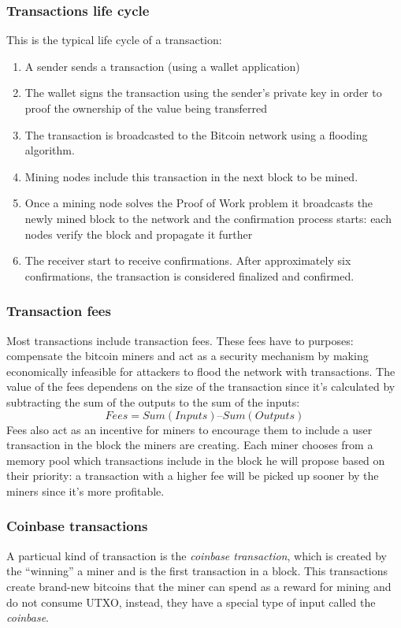 \subsubsection{Transactions life cycle}
This is the typical life cycle of a transaction:
\begin{enumerate}
  \item A sender sends a transaction (using a wallet application)
  \item The wallet signs the transaction using the sender's private key in order
  to proof the ownership of the value being transferred
  \item The transaction is broadcasted to the Bitcoin network using a flooding algorithm.
  \item Mining nodes include this transaction in the next block to be mined.
  \item Once a mining node solves the Proof of Work problem it broadcasts the
  newly mined block to the network and the confirmation process starts: each
  nodes verify the block and propagate it further
  \item The receiver start to receive confirmations. After approximately six
  confirmations, the transaction is considered finalized and confirmed.
\end{enumerate}




\subsubsection{Transaction fees} Most transactions include transaction fees.
These fees have to purposes: compensate the bitcoin miners and act as a security
mechanism by making economically infeasible for attackers to flood the network
with transactions. The value of the fees dependens on the size of the
transaction since it's calculated by subtracting the sum of the outputs to the
sum of the inputs: \[Fees = Sum(Inputs) – Sum(Outputs)\] Fees also  act as an
incentive for miners to encourage them to include a user transaction in the
block the miners are creating. Each miner chooses from a memory pool which
transactions include in the block he will propose based on their priority:  a
transaction with a higher fee will be picked up sooner by the miners since it's
more profitable.


\subsubsection{Coinbase transactions} A particual kind of transaction is the
\emph{coinbase transaction}, which is created by the ``winning'' a miner and is
the first transaction in a block. This transactions create brand-new bitcoins
that the miner can spend as a reward for mining and do not consume UTXO,
instead, they have a special type of input called the \emph{coinbase}.









